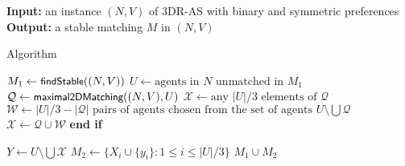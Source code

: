\begin{algorithm}
\textbf{Input:} an instance $(N, V)$ of 3DR-AS with binary and symmetric preferences\\
\textbf{Output:} a stable matching $M$ in $(N, V)$
\smallskip
\begin{algorithmic}
\caption{Algorithm~\label{alg:threed_sr_as_approximationalgo}} 
\State $M_1 \gets \algorithmfont{findStable}((N, V))$
\State $U \gets \text{agents in $N$ unmatched in $M_1$}$
\State $\mathcal{Q} \gets \algorithmfont{maximal2DMatching}((N, V), U)$
    \State $\mathcal{X} \gets \text{any $|U|/3$ elements of $\mathcal{Q}$}$
\Else
\State $\mathcal{W} \gets |U|/3 - |\mathcal{Q}| \text{ pairs of agents chosen from the set of agents $U \setminus \bigcup \mathcal{Q}$}$
\State $\mathcal{X} \gets \mathcal{Q} \cup \mathcal{W}$
\EndIf
\State \textbf{end if}
\smallskip

\State $Y \gets U \setminus \bigcup \mathcal{X}$
\State $M_2 \gets \{ X_i \cup \{ y_i \} : 1 \leq i \leq |U|/3\}$
\State \Return $M_1 \cup M_2$
\end{algorithmic}
\end{algorithm}